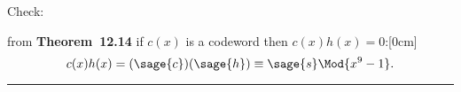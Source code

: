 \begin{enumerate}[label=(\roman*)]
Check:

from \textbf{Theorem~12.14} if $c(x)$ is a codeword then $c(x)h(x)=0$:[0cm]
\[
	c(x)h(x) = (\sage{c})(\sage{h}) \equiv \sage{s}\Mod{x^9 -1}.
\]
\end{enumerate}
\rule{\textwidth}{2px}
%





